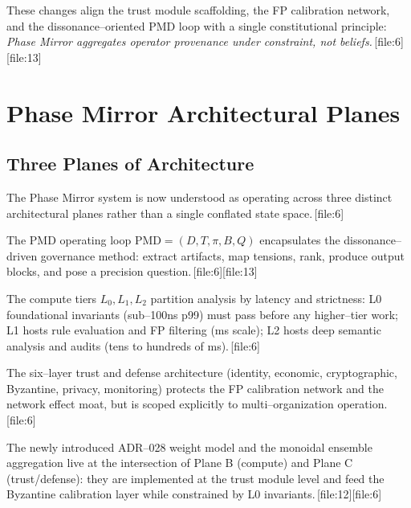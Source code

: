 \documentclass[11pt]{article}
\begin{document}
These changes align the trust module scaffolding, the FP calibration network,
and the dissonance--oriented PMD loop with a single constitutional principle:
\emph{Phase Mirror aggregates operator provenance under constraint, not
beliefs.}\,[file:6][file:13]

\section{Phase Mirror Architectural Planes}

\subsection{Three Planes of Architecture}

The Phase Mirror system is now understood as operating across three distinct
architectural planes rather than a single conflated state space.\,[file:6]

\begin{description}[leftmargin=*,style=nextline]
  \item[Plane A --- PMD Methodology Plane.] The PMD operating loop
  \(\text{PMD} = (D, T, \pi, B, Q)\) encapsulates the dissonance--driven
  governance method: extract artifacts, map tensions, rank, produce output
  blocks, and pose a precision question.\,[file:6][file:13]

  \item[Plane B --- L0--L2 Compute Plane.] The compute tiers \(L_0, L_1, L_2\)
  partition analysis by latency and strictness: L0 foundational invariants
  (sub--100ns p99) must pass before any higher--tier work; L1 hosts rule
  evaluation and FP filtering (ms scale); L2 hosts deep semantic analysis and
  audits (tens to hundreds of ms).\,[file:6]

  \item[Plane C --- Trust/Defense Plane.] The six--layer trust and defense
  architecture (identity, economic, cryptographic, Byzantine, privacy,
  monitoring) protects the FP calibration network and the network effect
  moat, but is scoped explicitly to multi--organization operation.\,[file:6]
\end{description}

The newly introduced ADR--028 weight model and the monoidal ensemble
aggregation live at the intersection of Plane B (compute) and Plane C
(trust/defense): they are implemented at the trust module level and feed the
Byzantine calibration layer while constrained by L0 invariants.\,[file:12][file:6]
\end{document}
